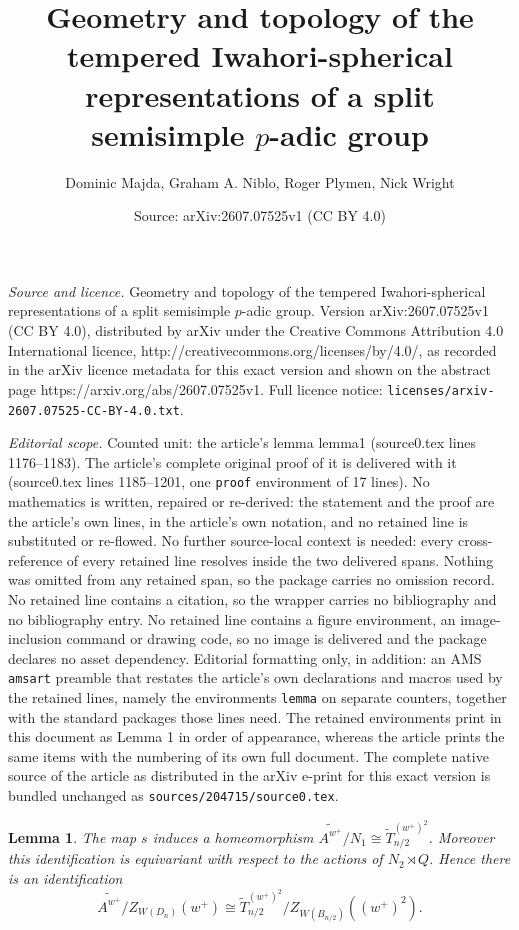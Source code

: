 \documentclass[10pt,a4paper]{amsart}
\title{Geometry and topology of the tempered Iwahori-spherical representations of a split semisimple $p$-adic group}
\author{Dominic Majda, Graham A. Niblo, Roger Plymen, Nick Wright}
\date{Source: arXiv:2607.07525v1 (CC BY 4.0)}
\newtheorem{lemma}{Lemma}
\def\TSpinn{\coveringtorus_{n/2}}
\def\coveringtorus{\tilde{T}}
\def\wplus{w^+}
\begin{document}
\maketitle

\noindent\emph{Source and licence.} Geometry and topology of the tempered Iwahori-spherical representations of a split semisimple $p$-adic group. Version arXiv:2607.07525v1 (CC BY 4.0), distributed by arXiv under the Creative Commons Attribution 4.0 International licence, http://creativecommons.org/licenses/by/4.0/, as recorded in the arXiv licence metadata for this exact version and shown on the abstract page https://arxiv.org/abs/2607.07525v1. Full licence notice: \texttt{licenses/arxiv-2607.07525-CC-BY-4.0.txt}.\par\smallskip

\noindent\textit{Editorial scope.} Counted unit: the article's lemma lemma1 (source0.tex lines 1176--1183). The article's complete original proof of it is delivered with it (source0.tex lines 1185--1201, one \texttt{proof} environment of 17 lines). No mathematics is written, repaired or re-derived: the statement and the proof are the article's own lines, in the article's own notation, and no retained line is substituted or re-flowed.  No further source-local context is needed: every cross-reference of every retained line resolves inside the two delivered spans.  Nothing was omitted from any retained span, so the package carries no omission record.  No retained line contains a citation, so the wrapper carries no bibliography and no bibliography entry.  No retained line contains a figure environment, an image-inclusion command or drawing code, so no image is delivered and the package declares no asset dependency.  Editorial formatting only, in addition: an AMS \texttt{amsart} preamble that restates the article's own declarations and macros used by the retained lines, namely the environments \texttt{lemma} on separate counters, together with the standard packages those lines need.  The retained environments print in this document as Lemma 1 in order of appearance, whereas the article prints the same items with the numbering of its own full document.  The complete native source of the article as distributed in the arXiv e-print for this exact version is bundled unchanged as \texttt{sources/204715/source0.tex}.
\begin{lemma}\label{lemma1}
The map $s$ induces a homeomorphism $\widetilde{A^{\wplus}}/N_1 \cong \TSpinn^{(\wplus)^2}$\!\!. 
Moreover this identification is equivariant with respect to the actions of $N_2\rtimes Q$. Hence there is an identification 
\[
\widetilde{A^{\wplus}}/Z_{W(D_n)}(\wplus) \cong \TSpinn
    ^{(\wplus)^2}/Z_{W(B_{n/2})}((\wplus)^2).
    \]
\end{lemma}
\end{document}
